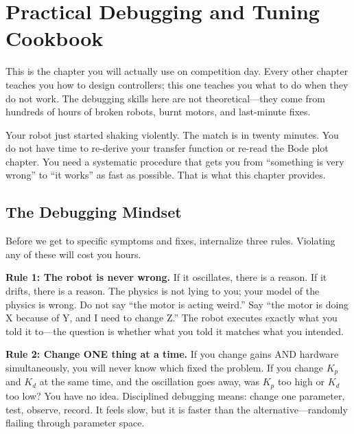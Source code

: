 \section{Practical Debugging and Tuning Cookbook}

This is the chapter you will actually use on competition day. Every other chapter teaches you how to design controllers; this one teaches you what to do when they do not work. The debugging skills here are not theoretical---they come from hundreds of hours of broken robots, burnt motors, and last-minute fixes.

Your robot just started shaking violently. The match is in twenty minutes. You do not have time to re-derive your transfer function or re-read the Bode plot chapter. You need a systematic procedure that gets you from ``something is very wrong'' to ``it works'' as fast as possible. That is what this chapter provides.

\subsection{The Debugging Mindset}

Before we get to specific symptoms and fixes, internalize three rules. Violating any of these will cost you hours.

\textbf{Rule 1: The robot is never wrong.} If it oscillates, there is a reason. If it drifts, there is a reason. The physics is not lying to you; your model of the physics is wrong. Do not say ``the motor is acting weird.'' Say ``the motor is doing X because of Y, and I need to change Z.'' The robot executes exactly what you told it to---the question is whether what you told it matches what you intended.

\textbf{Rule 2: Change ONE thing at a time.} If you change gains AND hardware simultaneously, you will never know which fixed the problem. If you change $K_p$ and $K_d$ at the same time, and the oscillation goes away, was $K_p$ too high or $K_d$ too low? You have no idea. Disciplined debugging means: change one parameter, test, observe, record. It feels slow, but it is faster than the alternative---randomly flailing through parameter space.

